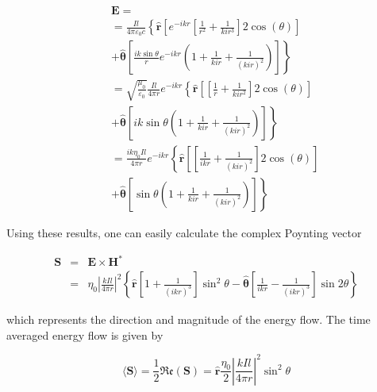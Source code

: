 \documentclass[a4paper,14pt]{extbook}
\begin{document}
\begin{eqnarray} \label{get_E_hd}
&&\mathbf{E}=\\
&&=\frac{  I l}{4 \pi \varepsilon_0 c} \left\{ \mathbf{\hat{r}} \left[ e^{-ikr } \left[  \frac{ 1}{ r^2} +\frac{1}{kir^3}\right]   2  \cos (\theta )   \right] \right. \nonumber\\
&&\left. +\mathbf{ \hat{\theta}} \left[ \frac{ik \sin \theta}{r}  e^{-ikr } \left( 1 + \frac{1}{kir}+  \frac{1}{(kir)^2} \right) \right] \right\} \nonumber  \\
&&=\sqrt{\frac{\mu_0}{ \varepsilon_0}}\frac{  I l}{4 \pi r} e^{-ikr } \left\{ \mathbf{\hat{r}} \left[  \left[  \frac{ 1}{ r} +\frac{1}{kir^2}\right]   2  \cos (\theta )   \right]  \right. \nonumber\\
&&\left.+\mathbf{ \hat{\theta}} \left[ ik \sin \theta   \left( 1 + \frac{1}{kir}+  \frac{1}{(kir)^2} \right) \right] \right\} \nonumber  \\
&&=\frac{i k \eta_0 I l}{4 \pi r} e^{-ikr } \left\{ \mathbf{\hat{r} }\left[  \left[  \frac{ 1}{ i k r} +\frac{1}{(kir)^2}\right]   2  \cos (\theta )   \right] \right. \nonumber\\
&&\left.+\mathbf{ \hat{\theta}} \left[  \sin \theta   \left( 1 + \frac{1}{kir}+  \frac{1}{(kir)^2} \right) \right] \right\} \nonumber
\end{eqnarray}

Using these results, one can easily calculate the complex Poynting vector

\begin{eqnarray} \label{poynting_hd}
\mathbf{S}&=&\mathbf{E} \times \mathbf{H}^* \\
&=& \eta_0 \left| \frac{ k I l}{4 \pi r}\right|^2 \left\{ \mathbf{\hat{r} }\left[ 1 + \frac{1}{(ikr)^3}\right] \sin^2 \theta - \mathbf{\hat{\theta}} \left[ \frac{1}{ikr} - \frac{1}{(ikr)^3}\right] \sin 2\theta \right\} \nonumber
\end{eqnarray}

which represents the direction and magnitude of the energy flow. The time averaged energy flow is given by

\begin{equation}\label{time_averaged_energy_flow_hd}
\langle \mathbf{S} \rangle = \frac{1}{2} \mathfrak{Re} (\mathbf{S}) =\mathbf{ \hat{r}} \frac{\eta_0}{2} \left| \frac{ k I l}{4 \pi r}\right|^2 \sin^2 \theta
\end{equation}
\end{document}
